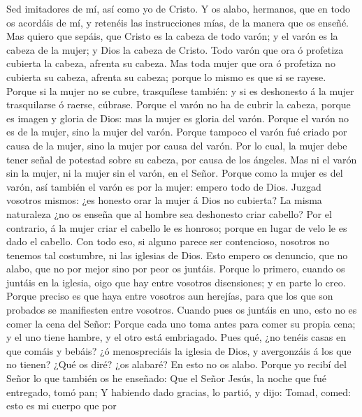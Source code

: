  Sed imitadores de mí, así como yo de Cristo.  Y
os alabo, hermanos, que en todo os acordáis de mí, y retenéis las
instrucciones mías, de la manera que os enseñé.  Mas quiero
que sepáis, que Cristo es la cabeza de todo varón; y el varón es la
cabeza de la mujer; y Dios la cabeza de Cristo.  Todo varón
que ora ó profetiza cubierta la cabeza, afrenta su cabeza. 
Mas toda mujer que ora ó profetiza no cubierta su cabeza, afrenta su
cabeza; porque lo mismo es que si se rayese.  Porque si la
mujer no se cubre, trasquílese también: y si es deshonesto á la mujer
trasquilarse ó raerse, cúbrase.  Porque el varón no ha de
cubrir la cabeza, porque es imagen y gloria de Dios: mas la mujer es
gloria del varón.  Porque el varón no es de la mujer, sino
la mujer del varón.  Porque tampoco el varón fué criado por
causa de la mujer, sino la mujer por causa del varón.  Por
lo cual, la mujer debe tener señal de potestad sobre su cabeza, por
causa de los ángeles.  Mas ni el varón sin la mujer, ni la
mujer sin el varón, en el Señor.  Porque como la mujer es
del varón, así también el varón es por la mujer: empero todo de Dios.
 Juzgad vosotros mismos: ¿es honesto orar la mujer á Dios
no cubierta?  La misma naturaleza ¿no os enseña que al
hombre sea deshonesto criar cabello?  Por el contrario, á
la mujer criar el cabello le es honroso; porque en lugar de velo le es
dado el cabello.  Con todo eso, si alguno parece ser
contencioso, nosotros no tenemos tal costumbre, ni las iglesias de Dios.
 Esto empero os denuncio, que no alabo, que no por mejor
sino por peor os juntáis.  Porque lo primero, cuando os
juntáis en la iglesia, oigo que hay entre vosotros disensiones; y en
parte lo creo.  Porque preciso es que haya entre vosotros
aun herejías, para que los que son probados se manifiesten entre
vosotros.  Cuando pues os juntáis en uno, esto no es comer
la cena del Señor:  Porque cada uno toma antes para comer
su propia cena; y el uno tiene hambre, y el otro está embriagado.
 Pues qué, ¿no tenéis casas en que comáis y bebáis? ¿ó
menospreciáis la iglesia de Dios, y avergonzáis á los que no tienen?
¿Qué os diré? ¿os alabaré? En esto no os alabo.  Porque yo
recibí del Señor lo que también os he enseñado: Que el Señor Jesús, la
noche que fué entregado, tomó pan;  Y habiendo dado
gracias, lo partió, y dijo: Tomad, comed: esto es mi cuerpo que por
